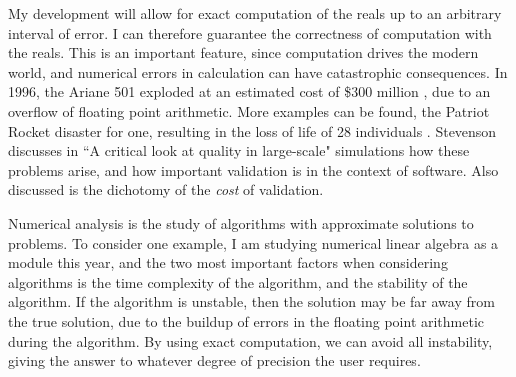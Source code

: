 \documentclass[ProjectReport]{subfiles}
\begin{document}


My development will allow for exact computation of the reals up to an arbitrary interval of error. I can therefore guarantee the correctness of computation with the reals. This is an important feature, since computation drives the modern world, and numerical errors in calculation can have catastrophic consequences. In 1996, the Ariane 501 exploded at an estimated cost of \$300 million \cite{ARIANE1}, due to an overflow of floating point arithmetic. More examples can be found, the Patriot Rocket disaster for one, resulting in the loss of life of 28 individuals \cite{office_patriot_nodate}. Stevenson discusses in ``A critical look at quality in large-scale" simulations \cite{QualityInSimulation} how these problems arise, and how important validation is in the context of software. Also discussed is the dichotomy of the \textit{cost} of validation. 

Numerical analysis is the study of algorithms with approximate solutions to problems. To consider one example, I am studying numerical linear algebra as a module this year, and the two most important factors when considering algorithms is the time complexity of the algorithm, and the stability of the algorithm. If the algorithm is unstable, then the solution may be far away from the true solution, due to the buildup of errors in the floating point arithmetic during the algorithm. By using exact computation, we can avoid all instability, giving the answer to whatever degree of precision the user requires.
\end{document}
